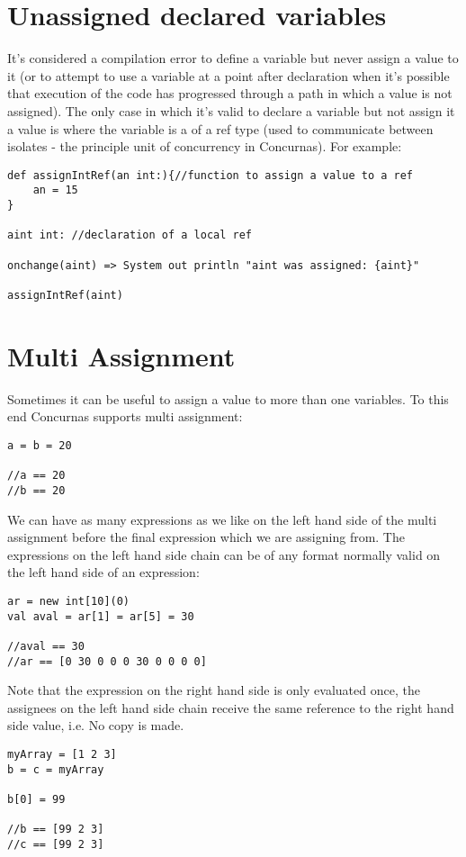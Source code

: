 \documentclass[conc-doc]{subfiles}
\begin{document}
\section{Unassigned declared variables}
It's considered a compilation error to define a variable but never assign a value to it (or to attempt to use a variable at a point after declaration when it's possible that execution of the code has progressed through a path in which a value is not assigned). The only case in which it's valid to declare a variable but not assign it a value is where the variable is a of a ref type (used to communicate between isolates - the principle unit of concurrency in Concurnas). For example:
\begin{lstlisting}
def assignIntRef(an int:){//function to assign a value to a ref
	an = 15
}

aint int: //declaration of a local ref

onchange(aint) => System out println "aint was assigned: {aint}"

assignIntRef(aint)
\end{lstlisting}

\section{Multi Assignment}
Sometimes it can be useful to assign a value to more than one variables. To this end Concurnas supports multi assignment:

\begin{lstlisting}
a = b = 20

//a == 20
//b == 20
\end{lstlisting}

We can have as many expressions as we like on the left hand side of the multi assignment before the final expression which we are assigning from. The expressions on the left hand side chain can be of any format normally valid on the left hand side of an expression:
\begin{lstlisting}
ar = new int[10](0)
val aval = ar[1] = ar[5] = 30

//aval == 30
//ar == [0 30 0 0 0 30 0 0 0 0]
\end{lstlisting}

Note that the expression on the right hand side is only evaluated once, the assignees on the left hand side chain receive the same reference to the right hand side value, i.e. No copy is made.
\begin{lstlisting}
myArray = [1 2 3]
b = c = myArray

b[0] = 99

//b == [99 2 3]
//c == [99 2 3]
\end{lstlisting}
\end{document}
